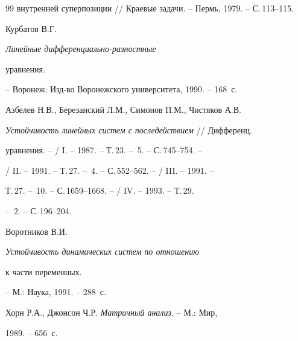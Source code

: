 \begin{thebibliography}{99}
{внутренней суперпозиции} // Краевые задачи. -- Пермь, 1979. -- С.\,113--115.







Курбатов В.Г. {\em Линейные дифференциально-разностные


уравнения.} -- Воронеж: Изд-во Воронежского университета, 1990. -- 168~с.







Азбелев Н.В., Березанский Л.М., Симонов П.М., Чистяков А.В.


{\em Устойчивость линейных систем с последействием} // Дифференц.


уравнения. -- / I. -- 1987. -- Т.\,23. -- \No\,5. -- С.\,745--754. --


/ II. -- 1991. -- Т.\,27. -- \No\,4. -- С.\,552--562. -- / III. -- 1991. --


Т.\,27. -- \No\,10. -- С.\,1659--1668. -- / IV. -- 1993. -- Т.\,29.


-- \No\,2. -- С.\,196--204.







Воротников В.И. {\em Устойчивость динамических систем по отношению


к части переменных.} -- М.: Наука, 1991. -- 288~с.







Хорн Р.А., Джонсон Ч.Р. {\em Матричный анализ.} -- М.: Мир,


1989. -- 656~с.





\end{thebibliography}





\vskip 2cm


















